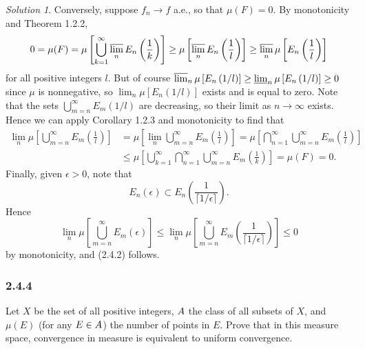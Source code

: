 \documentclass{report}
\let\cal\relax
\newcommand{\cal}[1]{\mathcal{#1}}
\theoremstyle{remark}
\newtheorem*{solution}{Solution}
\begin{document}
\begin{solution}
  Conversely, suppose $f_n \to f$ a.e., so that $\mu(F) = 0$. By monotonicity and Theorem 1.2.2,
  \begin{equation*}
    0 = \mu(F) = \mu \left[ \bigcup_{k=1}^\infty \varlimsup_n E_n \left( \frac{1}{k} \right) \right] \ge \mu \left[ \varlimsup_n E_n \left( \frac{1}{l} \right) \right] \ge \varlimsup_n \mu \left[ E_n \left( \frac{1}{l} \right) \right]
  \end{equation*}
  for all positive integers $l$. But of course $\varlimsup_n \mu \left[ E_n \left( 1/l \right) \right] \ge \varliminf_n \mu \left[ E_n \left( 1/l \right) \right] \ge 0$ since $\mu$ is nonnegative, so $\lim_n \mu \left[ E_n \left( 1/l \right) \right]$ exists and is equal to zero. Note that the sets $\bigcup_{m=n}^\infty E_m(1/l)$ are decreasing, so their limit as $n \to \infty$ exists. Hence we can apply Corollary 1.2.3 and monotonicity to find that
  \begin{equation*}
    \begin{split}
      \lim_n \mu \left[ \bigcup_{m=n}^\infty E_m \left( \frac{1}{l} \right) \right] &= \mu \left[ \lim_n \bigcup_{m=n}^\infty E_m \left( \frac{1}{l} \right) \right] = \mu \left[ \bigcap_{n=1}^\infty \bigcup_{m=n}^\infty E_m \left( \frac{1}{l} \right) \right] \\
      &\le \mu \left[\bigcup_{k=1}^\infty \bigcap_{n=1}^\infty \bigcup_{m=n}^\infty E_m \left( \frac{1}{k} \right) \right] = \mu(F) = 0.
    \end{split}
  \end{equation*}
  Finally, given $\epsilon > 0$, note that
  \begin{equation*}
    E_n(\epsilon) \subset E_n \left( \frac{1}{\lceil 1/\epsilon \rceil} \right).
  \end{equation*}
  Hence
  \begin{equation*}
    \lim_n \mu \left[ \bigcup_{m=n}^\infty E_m(\epsilon) \right] \le \lim_n \mu \left[ \bigcup_{m=n}^\infty E_m \left( \frac{1}{\lceil 1/\epsilon \rceil} \right) \right] \le 0
  \end{equation*}
  by monotonicity, and (2.4.2) follows.
\end{solution}

\subsubsection*{2.4.4}
Let $X$ be the set of all positive integers, $\cal A$ the class of all subsets of $X$, and $\mu(E)$ (for any $E \in \cal A$) the number of points in $E$. Prove that in this measure space, convergence in measure is equivalent to uniform convergence.
\end{document}

